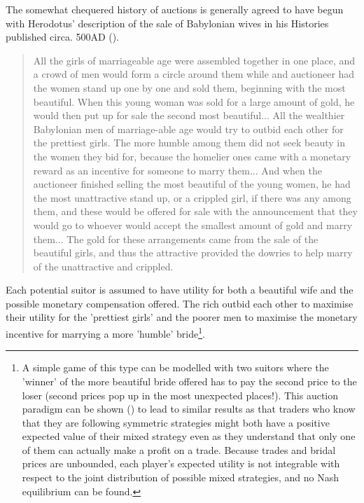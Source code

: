The somewhat chequered history of auctions is generally agreed to have begun with Herodotus' description of the sale of Babylonian wives in his Histories published circa. 500AD (\cite{rawlinson1885seven}).

\begin{quote}
All the girls of marriageable age were assembled together in one place, and a crowd of men would form a circle around them while and auctioneer had the women stand up one by one and sold them, beginning with the most beautiful. When this young woman was sold for a large amount of gold, he would then put up for sale the second most beautiful... All the wealthier Babylonian men of marriage-able age would try to outbid each other for the prettiest girls. The more humble among them did not seek beauty in the women they bid for, because the homelier ones came with a monetary reward as an incentive for someone to marry them... And when the auctioneer finished selling the most beautiful of the young women, he had the most unattractive stand up, or a crippled girl, if there was any among them, and these would be offered for sale with the announcement that they would go to whoever would accept the smallest amount of gold and marry them... The gold for these arrangements came from the sale of the beautiful girls, and thus the attractive provided the dowries to help marry of the unattractive and crippled.
\end{quote}

Each potential suitor is assumed to have utility for both a beautiful wife and the possible monetary compensation offered. The rich outbid each other to maximise their utility for the 'prettiest girls' and the poorer men to maximise the monetary incentive for marrying a more 'humble' bride\footnote{A simple game of this type can be modelled with two suitors where the 'winner' of the more beautiful bride offered has to pay the second price to the loser (second prices pop up in the most unexpected places!). This auction paradigm can be shown (\cite{bayeContestsRankorderSpillovers2012}) to lead to similar results as \cite{bhattacharyyaExAnteInterim1995} that traders who know that they are following symmetric strategies might both have a positive expected value of their mixed strategy even as they understand that only one of them can actually make a profit on a trade. Because trades and bridal prices are unbounded, each player's expected utility is not integrable with respect to the joint distribution of possible mixed strategies, and no Nash equilibrium can be found.}.

